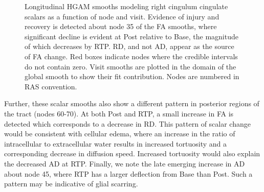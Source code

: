 \documentclass[12pt]{article}
\begin{document}
\begin{figure}[H]
	\centering
	\caption{Longitudinal HGAM smooths modeling right cingulum cingulate scalars as a function of node and visit. Evidence of injury and recovery is detected about node 35 of the FA smooths, where significant decline is evident at Post relative to Base, the magnitude of which decreases by RTP. RD, and not AD, appear as the source of FA change. Red boxes indicate nodes where the credible intervals do not contain zero. Visit smooths are plotted in the domain of the global smooth to show their fit contribution. Nodes are numbered in RAS convention.}
	\label{fig:lgio-gam-recov}
\end{figure}

Further, these scalar smooths also show a different pattern in posterior regions of the tract (nodes 60-70). At both Post and RTP, a small increase in FA is detected which corresponds to a decrease in RD. This pattern of scalar change would be consistent with cellular edema, where an increase in the ratio of intracellular to extracellular water results in increased tortuosity and a corresponding decrease in diffusion speed. Increased tortuosity would also explain the decreased AD at RTP. Finally, we note the late emerging increase in AD about node 45, where RTP has a larger deflection from Base than Post. Such a pattern may be indicative of glial scarring.
\end{document}
